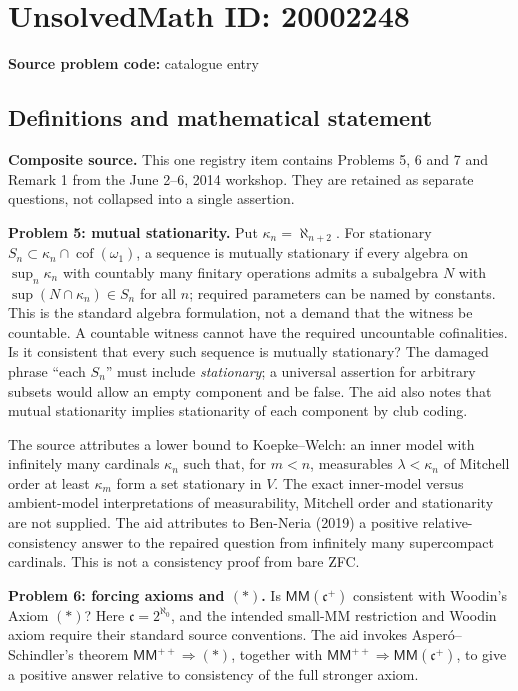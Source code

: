 \documentclass[11pt]{article}
\begin{document}
\section*{UnsolvedMath ID: 20002248}
\textbf{Source problem code:} catalogue entry
\subsection{Definitions and mathematical statement}
\textbf{Composite source.} This one registry item contains Problems 5, 6 and 7 and Remark 1 from the June 2--6, 2014 workshop. They are retained as separate questions, not collapsed into a single assertion.

\textbf{Problem 5: mutual stationarity.} Put $\kappa_n=\aleph_{n+2}$. For stationary $S_n\subset\kappa_n\cap\operatorname{cof}(\omega_1)$, a sequence is mutually stationary if every algebra on $\sup_n\kappa_n$ with countably many finitary operations admits a subalgebra $N$ with $\sup(N\cap\kappa_n)\in S_n$ for all $n$; required parameters can be named by constants. This is the standard algebra formulation, not a demand that the witness be countable. A countable witness cannot have the required uncountable cofinalities. Is it consistent that every such sequence is mutually stationary? The damaged phrase ``each $S_n$'' must include \emph{stationary}; a universal assertion for arbitrary subsets would allow an empty component and be false. The aid also notes that mutual stationarity implies stationarity of each component by club coding.

The source attributes a lower bound to Koepke--Welch: an inner model with infinitely many cardinals $\kappa_n$ such that, for $m<n$, measurables $\lambda<\kappa_n$ of Mitchell order at least $\kappa_m$ form a set stationary in $V$. The exact inner-model versus ambient-model interpretations of measurability, Mitchell order and stationarity are not supplied. The aid attributes to Ben-Neria (2019) a positive relative-consistency answer to the repaired question from infinitely many supercompact cardinals. This is not a consistency proof from bare ZFC.

\textbf{Problem 6: forcing axioms and $(*)$.} Is $\mathsf{MM}(\mathfrak c^+)$ consistent with Woodin's Axiom $(*)$? Here $\mathfrak c=2^{\aleph_0}$, and the intended small-MM restriction and Woodin axiom require their standard source conventions. The aid invokes Asper\'o--Schindler's theorem $\mathsf{MM}^{++}\Rightarrow(*)$, together with $\mathsf{MM}^{++}\Rightarrow\mathsf{MM}(\mathfrak c^+)$, to give a positive answer relative to consistency of the full stronger axiom.
\end{document}
